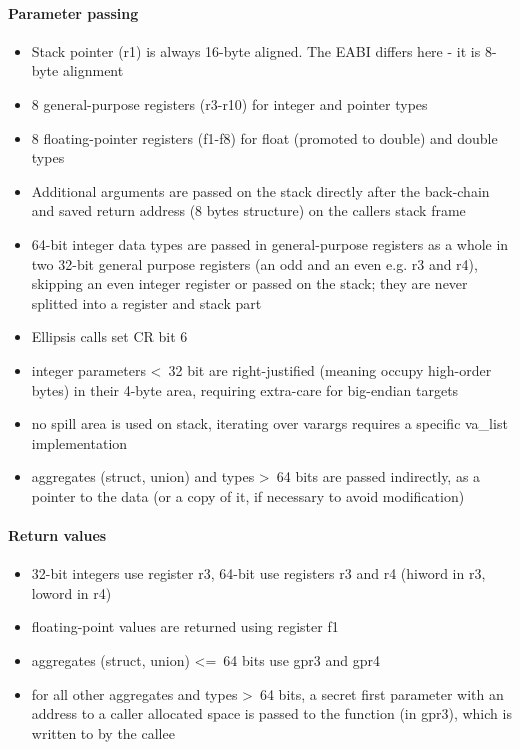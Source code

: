 \paragraph{Parameter passing}

\begin{itemize}
\item Stack pointer (r1) is always 16-byte aligned. The EABI differs here - it is 8-byte alignment
\item 8 general-purpose registers (r3-r10) for integer and pointer types
\item 8 floating-pointer registers (f1-f8) for float (promoted to double) and double types
\item Additional arguments are passed on the stack directly after the back-chain and saved return address (8 bytes structure) on the callers stack frame
\item 64-bit integer data types are passed in general-purpose registers as a whole in two
 32-bit general purpose registers (an odd and an even e.g. r3 and r4), skipping an even integer register
 or passed on the stack; they are never splitted into a register and stack part
\item Ellipsis calls set CR bit 6 
\item integer parameters \textless\ 32 bit are right-justified (meaning occupy high-order bytes) in their 4-byte area, requiring extra-care for big-endian targets
\item no spill area is used on stack, iterating over varargs requires a specific va\_list implementation
\item aggregates (struct, union) and types \textgreater\ 64 bits are passed indirectly, as a pointer to the data (or a copy of it, if necessary to avoid modification)
\end{itemize}

\paragraph{Return values}

\begin{itemize}
\item 32-bit integers use register r3, 64-bit use registers r3 and r4 (hiword in r3, loword in r4)
\item floating-point values are returned using register f1
\item aggregates (struct, union) \textless=\ 64 bits use gpr3 and gpr4
\item for all other aggregates and types \textgreater\ 64 bits, a secret first parameter with an address to a caller allocated space is passed to the function (in gpr3), which is written to by the callee
\end{itemize}



